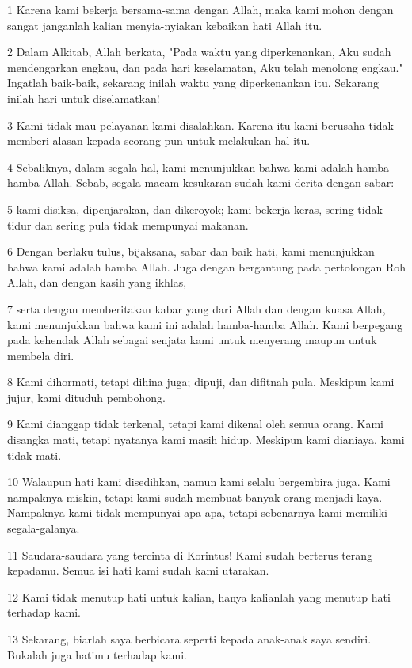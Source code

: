 \par 1 Karena kami bekerja bersama-sama dengan Allah, maka kami mohon dengan sangat janganlah kalian menyia-nyiakan kebaikan hati Allah itu.
\par 2 Dalam Alkitab, Allah berkata, "Pada waktu yang diperkenankan, Aku sudah mendengarkan engkau, dan pada hari keselamatan, Aku telah menolong engkau." Ingatlah baik-baik, sekarang inilah waktu yang diperkenankan itu. Sekarang inilah hari untuk diselamatkan!
\par 3 Kami tidak mau pelayanan kami disalahkan. Karena itu kami berusaha tidak memberi alasan kepada seorang pun untuk melakukan hal itu.
\par 4 Sebaliknya, dalam segala hal, kami menunjukkan bahwa kami adalah hamba-hamba Allah. Sebab, segala macam kesukaran sudah kami derita dengan sabar:
\par 5 kami disiksa, dipenjarakan, dan dikeroyok; kami bekerja keras, sering tidak tidur dan sering pula tidak mempunyai makanan.
\par 6 Dengan berlaku tulus, bijaksana, sabar dan baik hati, kami menunjukkan bahwa kami adalah hamba Allah. Juga dengan bergantung pada pertolongan Roh Allah, dan dengan kasih yang ikhlas,
\par 7 serta dengan memberitakan kabar yang dari Allah dan dengan kuasa Allah, kami menunjukkan bahwa kami ini adalah hamba-hamba Allah. Kami berpegang pada kehendak Allah sebagai senjata kami untuk menyerang maupun untuk membela diri.
\par 8 Kami dihormati, tetapi dihina juga; dipuji, dan difitnah pula. Meskipun kami jujur, kami dituduh pembohong.
\par 9 Kami dianggap tidak terkenal, tetapi kami dikenal oleh semua orang. Kami disangka mati, tetapi nyatanya kami masih hidup. Meskipun kami dianiaya, kami tidak mati.
\par 10 Walaupun hati kami disedihkan, namun kami selalu bergembira juga. Kami nampaknya miskin, tetapi kami sudah membuat banyak orang menjadi kaya. Nampaknya kami tidak mempunyai apa-apa, tetapi sebenarnya kami memiliki segala-galanya.
\par 11 Saudara-saudara yang tercinta di Korintus! Kami sudah berterus terang kepadamu. Semua isi hati kami sudah kami utarakan.
\par 12 Kami tidak menutup hati untuk kalian, hanya kalianlah yang menutup hati terhadap kami.
\par 13 Sekarang, biarlah saya berbicara seperti kepada anak-anak saya sendiri. Bukalah juga hatimu terhadap kami.

